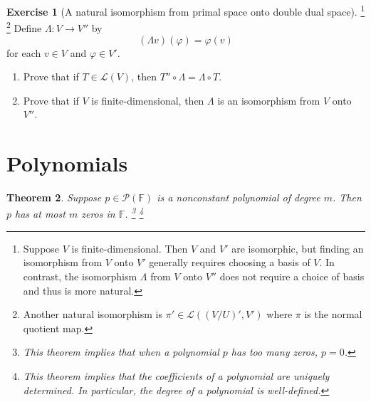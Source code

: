 \documentclass[colorlinks]{tufte-handout}
\theoremstyle{plain} %
\newtheorem{thm}{Theorem}
\theoremstyle{definition}
\newtheorem{exer}[thm]{Exercise}
\theoremstyle{remark}
\newcommand{\bra}[1]{\mathopen{}\left(#1\right)}
\renewcommand{\phi}{\varphi}
\newcommand{\F}{\mathbb{F}}
\renewcommand{\L}{\mathcal{L}}
\renewcommand{\P}{\mathcal{P}}
\begin{document}
\begin{exer}[A natural isomorphism from primal space onto double dual space]%
	\footnote{Suppose $V$ is finite-dimensional. Then $V$ and $V'$ are isomorphic, but finding an isomorphism from $V$ onto $V'$ generally requires choosing a basis of $V$. In contrast, the isomorphism $\Lambda$ from $V$ onto $V''$ does not require a choice of basis and thus is more natural.}%
	\footnote{Another natural isomorphism is $\pi'\in\L\bra{(V/U)',V'}$ where $\pi$ is the normal quotient map.}
	Define $\Lambda:V\to V''$ by
	\[(\Lambda v)(\phi)=\phi(v)\]
	for each $v\in V$ and $\phi\in V'$.
	\begin{enumerate}
		\item Prove that if $T\in\L(V)$, then $T''\circ\Lambda=\Lambda\circ T$.
		\item Prove that if $V$ is finite-dimensional, then $\Lambda$ is an isomorphism from $V$ onto $V''$.
	\end{enumerate}
\end{exer}


\section{Polynomials}

\begin{thm}
	Suppose $p\in\P(\F)$ is a nonconstant polynomial of degree $m$. Then $p$ has at most $m$ zeros in $\F$.%
	\footnote{This theorem implies that when a polynomial $p$ has too many zeros, $p=0$.}%
    \footnote{This theorem implies that the coefficients of a polynomial are uniquely determined. In particular, the \emph{degree} of a polynomial is well-defined.}
\end{thm}
\end{document}
